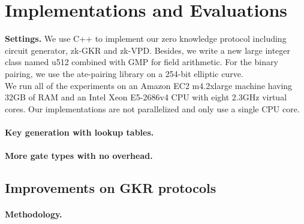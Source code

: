 
\section{Implementations and Evaluations}\label{sec:eval}



\textbf{Settings.} We use C++ to implement our zero knowledge protocol including circuit generator, zk-GKR and zk-VPD. Besides, we write a new large integer class named u512 combined with GMP\cite{GNU} for field arithmetic. For the binary pairing, we use the ate-pairing\cite{ate-pairing} library on a 254-bit elliptic curve.\\
We run all of the experiments on an Amazon EC2 m4.2xlarge machine having 32GB of RAM and an Intel Xeon E5-2686v4 CPU with eight 2.3GHz virtual cores. Our implementations are not parallelized and only use a single CPU core.\\

\paragraph{Key generation with lookup tables.}

\paragraph{More gate types with no overhead.}

\subsection{Improvements on GKR protocols}\label{subsec:expGKR}
\paragraph{Methodology.}


